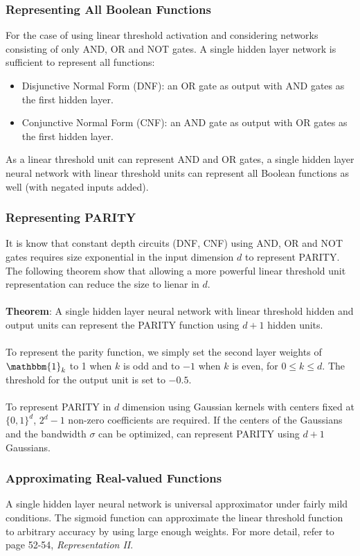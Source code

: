 \documentclass{article}
\begin{document}
   \subsubsection{Representing All Boolean Functions}
   For the case of using linear threshold activation and considering networks consisting of only AND, OR and NOT gates. A single hidden layer network is sufficient to represent all functions:
   \begin{itemize}
   \item Disjunctive Normal Form (DNF): an OR gate as output with AND gates as the first hidden layer.
   \item Conjunctive Normal Form (CNF): an AND gate as output with OR gates as the first hidden layer.
   \end{itemize}
   As a linear threshold unit can represent AND and OR gates, a single hidden layer neural network with linear threshold units can represent all Boolean functions as well (with negated inputs added).
   
   \subsubsection{Representing PARITY}
   It is know that constant depth circuits (DNF, CNF) using AND, OR and NOT gates requires size exponential in the input dimension $d$ to represent PARITY. The following theorem show that allowing a more powerful linear threshold unit representation can reduce the size to lienar in $d$.
   \\\\
   \textbf{Theorem}: A single hidden layer neural network with linear threshold hidden and output units can represent the PARITY function using $d+1$ hidden units.
   \\\\
   To represent the parity function, we simply set the second layer weights of $\mathbbm{1}_k$ to 1 when $k$ is odd and to $-1$ when $k$ is even, for $0 \leq k \leq d$. The threshold for the output unit is set to $-0.5$.
   \\\\
   To represent PARITY in $d$ dimension using Gaussian kernels with centers fixed at $\{0, 1\}^d$, $2^d - 1$ non-zero coefficients are required. If the centers of the Gaussians and the bandwidth $\sigma$ can be optimized, can represent PARITY using $d+1$ Gaussians.
   
   \subsubsection{Approximating Real-valued Functions}
   A single hidden layer neural network is universal approximator under fairly mild conditions. The sigmoid function can approximate the linear threshold function to arbitrary accuracy by using large enough weights. For more detail, refer to page 52-54, \textit{Representation II}.
   
\end{document}
